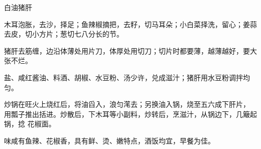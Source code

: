 %
%
%
%
%
%
%
\begin{recipe}{白油猪肝}

\ingredients


\preparation

\step 木耳泡胀，去沙，择足；鱼辣椒摘把，去籽，切马耳朵；小白菜择洗，留心；姜蒜
去皮，切小方片；葱切七八分长的节。

\step 猪肝去筋缠，边沿体薄处用片刀，体厚处用切刀；切片时都要薄，越薄越好，要大
张不烂。

\step 盐、咸红酱油、料酒、胡椒、水豆粉、汤少许，兑成滋汁；猪肝用水豆粉调拌均匀。

\step 炒锅在旺火上烧红后，将油舀入，浪匀滗去；另换油入锅，烧至五六成下肝片，
用瓢子推出括进。炒散后，下木耳等小副料，炒转后，烹滋汁，从锅边下，几簸起锅，捻
花椒面。

\features

味咸有鱼辣、花椒香，具有鲜、烫、嫩特点，酒饭均宜，早餐为佳。

\end{recipe}

